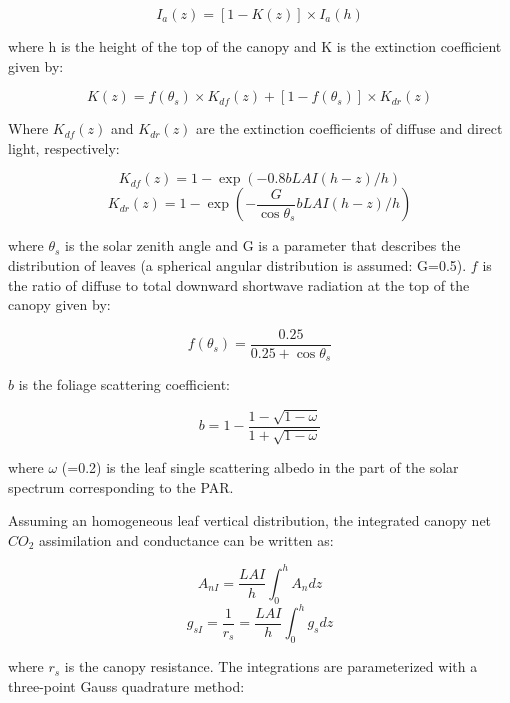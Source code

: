 {\begin{equation}
I_{a}(z)=\left[1-K(z)\right] \times I_{a}(h)
\end{equation}

where h is the height of the top of the canopy and K is the extinction coefficient given by:

\begin{equation}
K(z) = f(\theta_{s})\times K_{df}(z)+\left[ 1-f(\theta_{s}) \right]\times K_{dr}(z)
\end{equation}

Where $K_{df}(z)$ and $K_{dr}(z)$ are the extinction coefficients of diffuse and direct light, respectively:

\begin{equation}
K_{df}(z) = 1-\exp(-0.8bLAI(h-z)/h)
\end{equation}
\begin{equation}
K_{dr}(z) = 1-\exp \left ( -\frac{G}{\cos\theta_{s}}bLAI(h-z)/h \right )
\end{equation}

where $\theta_{s}$ is the solar zenith angle and G is a parameter that describes the distribution of leaves (a
spherical angular distribution is assumed: G=0.5). $f$ is the ratio of diffuse to total downward shortwave
radiation at the top of the canopy given by:

\begin{equation}
f(\theta_{s})=\frac{0.25}{0.25+\cos\theta_{s}}
\end{equation}

$b$ is the foliage scattering coefficient:

\begin{equation}
b=1-\frac{1-\sqrt{1-\omega}}{1+\sqrt{1-\omega}}
\end{equation}


where $\omega$ (=0.2) is the leaf single scattering albedo in the part of the solar spectrum corresponding to
the PAR.

Assuming an homogeneous leaf vertical distribution, the integrated canopy net $CO_{2}$ assimilation and
conductance can be written as:

\begin{equation}
A_{nI}=\frac{LAI}{h}\int_{0}^{h}A_{n}dz
\end{equation}
\begin{equation}
g_{sI}=\frac{1}{r_{s}}=\frac{LAI}{h}\int_{0}^{h}g_{s}dz
\end{equation}

where $r_{s}$ is the canopy resistance. The integrations are parameterized with a three-point Gauss
quadrature method:

}
